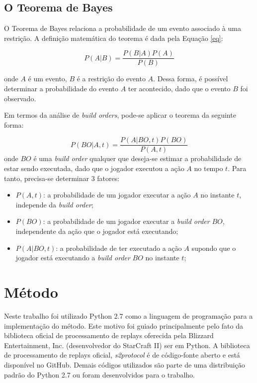 		\section{O Teorema de Bayes}
O Teorema de Bayes relaciona a probabilidade de um evento associado à uma restrição. A definição matemática do teorema é dada pela Equação \ref{eq}:

\begin{equation}
	P(A|B) = \frac{P(B|A)P(A)}{P(B)}
\end{equation}

\noindent onde $A$ é um evento, $B$ é a restrição do evento $A$. Dessa forma, é possível determinar a probabilidade do evento $A$ ter acontecido, dado que o evento $B$ foi observado.

Em termos da análise de \textit{build orders}, pode-se aplicar o teorema da seguinte forma:

\begin{equation}
	P(BO|A, t) = \frac{P(A|BO, t)P(BO)}{P(A, t)}
\end{equation}
\noindent onde $BO$ é uma \textit{build order} qualquer que deseja-se estimar a probabilidade de estar sendo executada, dado que o jogador executou a ação $A$ no tempo $t$. Para tanto, precisa-se determinar 3 fatores:

\begin{itemize}
	\item $P(A, t)$: a probabilidade de um jogador executar a ação $A$ no instante $t$, independe da \textit{build order};
	\item $P(BO)$: a probabilidade de um jogador executar a \textit{build order} $BO$, independente da ação que o jogador está executando;
	\item $P(A|BO, t)$: a probabilidade de ter executado a ação $A$ supondo que o jogador está executando a \textit{build order} $BO$ no instante $t$;
\end{itemize}

	\chapter{Método}
Neste trabalho foi utilizado Python 2.7 como a linguagem de programação para a implementação do método. Este motivo foi guiado principalmente pelo fato da biblioteca oficial de processamento de replays oferecida pela Blizzard Entertainment, Inc. (desenvolvedor do StarCraft II) ser em Python. A biblioteca de processamento de replays oficial, \textit{s2protocol}\cite{s2protocol} é de código-fonte aberto e está disponível no GitHub. Demais códigos utilizados são parte de uma distribuição padrão do Python 2.7 ou foram desenvolvidos para o trabalho.

